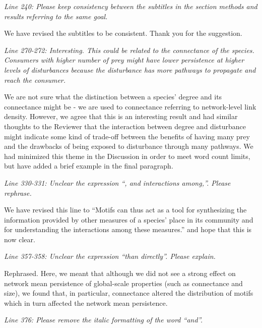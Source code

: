 \documentclass[12pt]{article}
\newcommand{\us}{\rm \setlength{\leftskip}{0.3cm} \setlength{\rightskip}{0.3cm}}
\newcommand{\them}{\it \setlength{\leftskip}{0cm} \setlength{\rightskip}{0cm}}
\begin{document}
        \them
        Line 240: Please keep consistency between the subtitles in the section methods and results referring to the same goal.
        
        \us We have revised the subtitles to be consistent. Thank you for the suggestion.
        
        \them
        Line 270-272: Interesting. This could be related to the connectance of the species. Consumers with higher number of prey might have lower persistence at higher levels of disturbances because the disturbance has more pathways to propagate and reach the consumer.
        
        \us We are not sure what the distinction between a species' degree and its connectance might be - we are used to connectance referring to network-level link density. 
        However, we agree that this is an interesting result and had similar thoughts to the Reviewer that the interaction between degree and disturbance might indicate some kind of trade-off between the benefits of having many prey and the drawbacks of being exposed to disturbance through many pathways.
        We had minimized this theme in the Discussion in order to meet word count limits, but have added a brief example in the final paragraph.
        
        
        \them
        Line 330-331: Unclear the expression “, and interactions among,”. Please rephrase.
        
        \us We have revised this line to ``Motifs can thus act as a tool for synthesizing the information provided by other measures of a species' place in its community and for understanding the interactions among these measures.'' and hope that this is now clear.
        
        \them
        Line 357-358: Unclear the expression “than directly”. Please explain.
        
        \us
        Rephrased. Here, we meant that although we did not see a strong effect on network mean persistence of global-scale properties (such as connectance and size), we found that, in particular, connectance altered the distribution of motifs which in turn affected the network mean persistence.  
        
        \them
        Line 376: Please remove the italic formatting of the word “and”.
        
\end{document}
